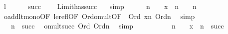 \begin{isabellebody}
\ l\isanewline
\ \ \ \ \isamarkupfalse%
\ {\isachardoublequoteopen}succ{\isacharparenleft}{\kern0pt}{\isasymalpha}{\isacharparenright}{\kern0pt}\ {\isacharless}{\kern0pt}\ {\isasymbeta}{\isachardoublequoteclose}\ \isamarkupfalse%
\ Limit{\isacharunderscore}{\kern0pt}has{\isacharunderscore}{\kern0pt}succ\ {\isacartoucheopen}{\isasymalpha}{\isacharless}{\kern0pt}{\isasymbeta}{\isacartoucheclose}\ \isamarkupfalse%
\ simp\isanewline
\ \ \ \ \isamarkupfalse%
\ {\isachardoublequoteopen}n\ {\isacharasterisk}{\kern0pt}{\isacharasterisk}{\kern0pt}\ {\isasymalpha}\ {\isacharplus}{\kern0pt}{\isacharplus}{\kern0pt}\ x\ {\isacharless}{\kern0pt}\ n\ {\isacharasterisk}{\kern0pt}{\isacharasterisk}{\kern0pt}\ {\isasymalpha}\ {\isacharplus}{\kern0pt}{\isacharplus}{\kern0pt}\ n{\isachardoublequoteclose}\ \isanewline
\ \ \ \ \ \ \isamarkupfalse%
\ oadd{\isacharunderscore}{\kern0pt}lt{\isacharunderscore}{\kern0pt}mono{\isacharbrackleft}{\kern0pt}OF\ le{\isacharunderscore}{\kern0pt}refl{\isacharbrackleft}{\kern0pt}OF\ Ord{\isacharunderscore}{\kern0pt}omult{\isacharbrackleft}{\kern0pt}OF\ {\isacharunderscore}{\kern0pt}\ {\isacartoucheopen}Ord{\isacharparenleft}{\kern0pt}{\isasymalpha}{\isacharparenright}{\kern0pt}{\isacartoucheclose}{\isacharbrackright}{\kern0pt}{\isacharbrackright}{\kern0pt}\ {\isacartoucheopen}x{\isacharless}{\kern0pt}n{\isacartoucheclose}{\isacharbrackright}{\kern0pt}\ {\isacartoucheopen}Ord{\isacharparenleft}{\kern0pt}n{\isacharparenright}{\kern0pt}{\isacartoucheclose}\ \isamarkupfalse%
\ simp\isanewline
\ \ \ \ \isamarkupfalse%
\isanewline
\ \ \ \ \isamarkupfalse%
\ {\isachardoublequoteopen}{\isachardot}{\kern0pt}{\isachardot}{\kern0pt}{\isachardot}{\kern0pt}\ {\isacharequal}{\kern0pt}\ n\ {\isacharasterisk}{\kern0pt}{\isacharasterisk}{\kern0pt}\ succ{\isacharparenleft}{\kern0pt}{\isasymalpha}{\isacharparenright}{\kern0pt}{\isachardoublequoteclose}\ \isamarkupfalse%
\ omult{\isacharunderscore}{\kern0pt}succ\ {\isacartoucheopen}Ord{\isacharparenleft}{\kern0pt}{\isasymalpha}{\isacharparenright}{\kern0pt}{\isacartoucheclose}\ {\isacartoucheopen}Ord{\isacharparenleft}{\kern0pt}n{\isacharparenright}{\kern0pt}{\isacartoucheclose}\ \isamarkupfalse%
\ simp\isanewline
\ \ \ \ \isamarkupfalse%
\isanewline
\ \ \ \ \isamarkupfalse%
\ {\isachardoublequoteopen}n\ {\isacharasterisk}{\kern0pt}{\isacharasterisk}{\kern0pt}\ {\isasymalpha}\ {\isacharplus}{\kern0pt}{\isacharplus}{\kern0pt}\ x\ {\isacharless}{\kern0pt}\ n\ {\isacharasterisk}{\kern0pt}{\isacharasterisk}{\kern0pt}\ succ{\isacharparenleft}{\kern0pt}{\isasymalpha}{\isacharparenright}{\kern0pt}{\isachardoublequoteclose}\ \isamarkupfalse%

\end{isabellebody}
